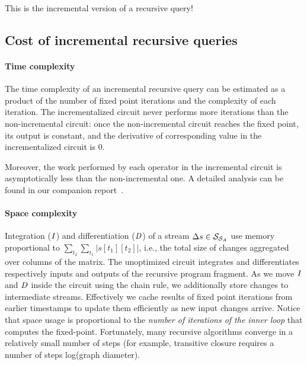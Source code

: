 \noindent This is the incremental version of a recursive query!



\subsection{Cost of incremental recursive queries}

\paragraph{Time complexity}

The time complexity of an incremental recursive query can be estimated
as a product of the number of fixed point iterations and the
complexity of each iteration. The incrementalized circuit never
performs more iterations than the non-incremental circuit: once the
non-incremental circuit reaches the fixed point, its output is
constant, and the derivative of corresponding value in the
incrementalized circuit is 0.

Moreover, the work performed by each operator in the incremental
circuit is asymptotically less than the non-incremental one.  A
detailed analysis can be found in our companion report~\cite{tr}.


\paragraph{Space complexity} Integration ($\mathit{I}$) and differentiation ($\mathit{D}$) of a
stream $\Delta s \in \mathcal{S}_{\mathcal{S}_{A}}$ use memory proportional to
$\sum_{t_2}\sum_{t_1}|s[t_1][t_2]|$, i.e., the total size of changes
aggregated over columns of the matrix.  The unoptimized circuit integrates
and differentiates respectively inputs and outputs of the recursive program
fragment.  As we move $\mathit{I}$ and $\mathit{D}$ inside the circuit using the chain rule, we
additionally store changes to intermediate streams.  Effectively we cache results of
fixed point iterations from earlier timestamps to update them efficiently as new input changes arrive.
Notice that space usage is proportional to the \emph{number of iterations of the inner loop}
that computes the fixed-point.
Fortunately, many recursive algorithms converge in a relatively small number of steps
(for example, transitive closure requires a number of steps  log(graph diameter).
